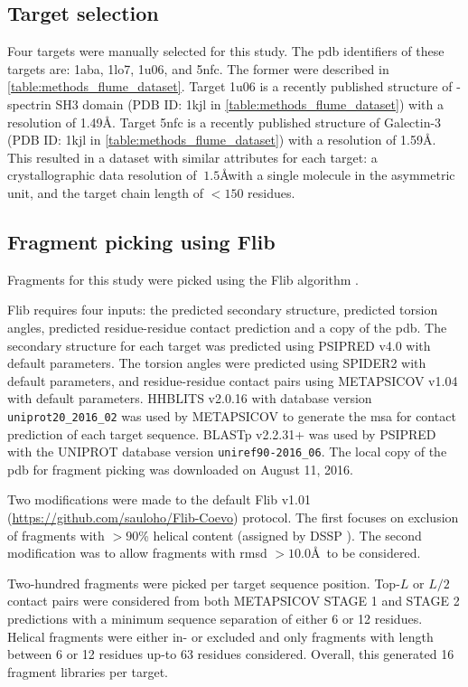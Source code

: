 \subsection{Target selection}
Four targets were manually selected for this study. The \gls{pdb} identifiers of these targets are: 1aba, 1lo7, 1u06, and 5nfc. The former were described in \cref{table:methods_flume_dataset}. Target 1u06 is a recently published structure of \textalpha-spectrin SH3 domain (PDB ID: 1kjl in \cref{table:methods_flume_dataset}) with a resolution of 1.49\AA. Target 5nfc is a recently published structure of Galectin-3 (PDB ID: 1kjl in \cref{table:methods_flume_dataset}) with a resolution of 1.59\AA. This resulted in a dataset with similar attributes for each target: a crystallographic data resolution of $~1.5$\AA with a single molecule in the asymmetric unit, and the target chain length of $<150$ residues.

\subsection{Fragment picking using Flib}
Fragments for this study were picked using the Flib algorithm \cite{De_Oliveira2015-ba}. 

Flib requires four inputs: the predicted secondary structure, predicted torsion angles, predicted residue-residue contact prediction and a copy of the \gls{pdb}. The secondary structure for each target was predicted using PSIPRED v4.0 \cite{Jones1999-fi} with default parameters. The torsion angles were predicted using SPIDER2 \cite{Heffernan2015-wp} with default parameters, and residue-residue contact pairs using METAPSICOV v1.04 \cite{Jones2015-wp} with default parameters. HHBLITS v2.0.16 \cite{Remmert2011-ze} with database version \texttt{uniprot20\_2016\_02} was used by METAPSICOV to generate the \gls{msa} for contact prediction of each target sequence. BLASTp v2.2.31+ \cite{Altschul1990-nc,Camacho2009-ue} was used by PSIPRED with the UNIPROT database version \texttt{uniref90-2016\_06}. The local copy of the \gls{pdb} for fragment picking was downloaded on August 11, 2016.

Two modifications were made to the default Flib v1.01 (\url{https://github.com/sauloho/Flib-Coevo}) protocol. The first focuses on exclusion of fragments with $>90$\% helical content (assigned by DSSP \cite{Frishman1995-ns}). The second modification was to allow fragments with \gls{rmsd} $>10.0$\AA\ to be considered.

Two-hundred fragments were picked per target sequence position. Top-$L$ or $L/2$ contact pairs were considered from both METAPSICOV STAGE 1 and STAGE 2 predictions with a minimum sequence separation of either 6 or 12 residues. Helical fragments were either in- or excluded and only fragments with length between 6 or 12 residues up-to 63 residues considered. Overall, this generated 16 fragment libraries per target.

